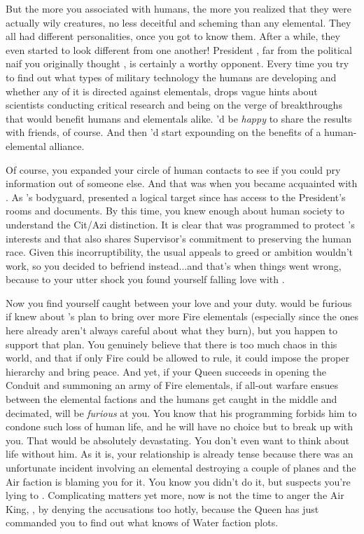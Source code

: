 \documentclass[char]{elementals}
\begin{document}
But the more you associated with humans, the more you realized that they were actually wily creatures, no less deceitful and scheming than any elemental.  They all had different personalities, once you got to know them.  After a while, they even started to look different from one another!  President \cLeader{}, far from the political naif you originally thought \cLeader{\them}, is certainly a worthy opponent.  Every time you try to find out what types of military technology the humans are developing and whether any of it is directed against elementals, \cLeader{\they} drops vague hints about \cLeader{\their} scientists conducting critical research and being on the verge of breakthroughs that would benefit humans and elementals alike.  \cLeader{\They}'d be \emph{happy} to share the results with \cLeader{\their} friends, of course.  And then \cLeader{\they}'d start expounding on the benefits of a human-elemental alliance.

Of course, you expanded your circle of human contacts to see if you could pry information out of someone else.  And that was when you became acquainted with \cRomeo{}.  As \cLeader{}'s bodyguard, \cRomeo{\they} presented a logical target since \cRomeo{\they} has access to the President's rooms and documents.  By this time, you knew enough about human society to understand the Cit/Azi distinction.  It is clear that \cRomeo{\they} was programmed to protect \cLeader{}'s interests and that \cRomeo{\they} also shares \cRomeo{\their} Supervisor's commitment to preserving the human race.  Given this incorruptibility, the usual appeals to greed or ambition wouldn't work, so you decided to befriend \cRomeo{\them} instead...and that's when things went wrong, because to your utter shock you found yourself falling love with \cRomeo{\them}.

Now you find yourself caught between your love and your duty.  \cRomeo{} would be furious if \cRomeo{\they} knew about \cQueen{}'s plan to bring over more Fire elementals (especially since the ones here already aren't always careful about what they burn), but you happen to support that plan. You genuinely believe that there is too much chaos in this world, and that if only Fire could be allowed to rule, it could impose the proper hierarchy and bring peace.  And yet, if your Queen succeeds in opening the Conduit and summoning an army of Fire elementals, if all-out warfare ensues between the elemental factions and the humans get caught in the middle and decimated, \cRomeo{} will be \emph{furious} at you.  You know that his programming forbids him to condone such loss of human life, and he will have no choice but to break up with you.  That would be absolutely devastating.  You don't even want to think about life without him.  As it is, your relationship is already tense because there was an unfortunate incident involving an elemental destroying a couple of planes and the Air faction is blaming you for it.  You know you didn't do it, but \cRomeo{} suspects you're lying to \cRomeo{\them}.  Complicating matters yet more, now is not the time to anger the Air King, \cKing{}, by denying the accusations too hotly, because the Queen has just commanded you to find out what \cKing{\they} knows of Water faction plots.  
\end{document}
